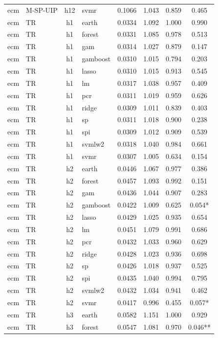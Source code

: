 \begin{ThreePartTable}
\begin{longtable}[t]{llclcccc}
ecm & M-SP-UIP & h12 & svmr & 0.1066 & 1.043 & 0.859 & 0.465\\
\addlinespace
ecm & TR & h1 & earth & 0.0334 & 1.092 & 1.000 & 0.990\\
ecm & TR & h1 & forest & 0.0331 & 1.085 & 0.978 & 0.513\\
ecm & TR & h1 & gam & 0.0314 & 1.027 & 0.879 & 0.147\\
ecm & TR & h1 & gamboost & 0.0310 & 1.015 & 0.794 & 0.203\\
ecm & TR & h1 & lasso & 0.0310 & 1.015 & 0.913 & 0.545\\
ecm & TR & h1 & lm & 0.0317 & 1.038 & 0.957 & 0.409\\
ecm & TR & h1 & pcr & 0.0311 & 1.019 & 0.959 & 0.626\\
ecm & TR & h1 & ridge & 0.0309 & 1.011 & 0.839 & 0.403\\
ecm & TR & h1 & sp & 0.0311 & 1.018 & 0.900 & 0.238\\
ecm & TR & h1 & spi & 0.0309 & 1.012 & 0.909 & 0.539\\
ecm & TR & h1 & svmlw2 & 0.0318 & 1.040 & 0.984 & 0.661\\
ecm & TR & h1 & svmr & 0.0307 & 1.005 & 0.634 & 0.154\\
\addlinespace
ecm & TR & h2 & earth & 0.0446 & 1.067 & 0.977 & 0.386\\
ecm & TR & h2 & forest & 0.0457 & 1.093 & 0.992 & 0.151\\
ecm & TR & h2 & gam & 0.0436 & 1.044 & 0.907 & 0.283\\
ecm & TR & h2 & gamboost & 0.0422 & 1.009 & 0.625 & 0.054*\\
ecm & TR & h2 & lasso & 0.0429 & 1.025 & 0.935 & 0.654\\
ecm & TR & h2 & lm & 0.0451 & 1.079 & 0.991 & 0.686\\
ecm & TR & h2 & pcr & 0.0432 & 1.033 & 0.960 & 0.629\\
ecm & TR & h2 & ridge & 0.0428 & 1.023 & 0.936 & 0.698\\
ecm & TR & h2 & sp & 0.0426 & 1.018 & 0.937 & 0.525\\
ecm & TR & h2 & spi & 0.0435 & 1.040 & 0.994 & 0.795\\
ecm & TR & h2 & svmlw2 & 0.0432 & 1.034 & 0.941 & 0.462\\
ecm & TR & h2 & svmr & 0.0417 & 0.996 & 0.455 & 0.057*\\
\addlinespace
ecm & TR & h3 & earth & 0.0582 & 1.151 & 1.000 & 0.929\\
ecm & TR & h3 & forest & 0.0547 & 1.081 & 0.970 & 0.046**\\

\end{longtable}
\end{ThreePartTable}
